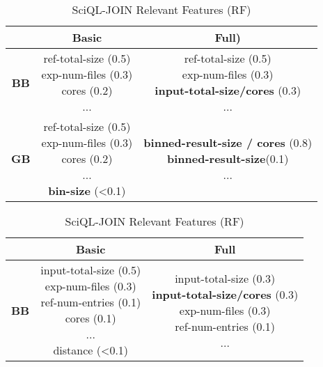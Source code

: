 \begin{table}[t]

\centering
\caption{SciQL-MAP Relevant Features (RF)}
\label{tab:relevant-features-map}

\begin{tabular}{|c||c||c|}
\hline
        & \textbf{Basic} &  \textbf{Full)} 


    \\ \hline
    
    \textbf{BB} 
    & \makecell{ref-total-size (0.5) \\ exp-num-files (0.3) \\ cores (0.2) \\ ...} 
    & \makecell{ ref-total-size (0.5) \\ exp-num-files (0.3) \\ \textbf{input-total-size/cores} (0.3) \\ ...} 
   
    
   \\ \hline %
    
    \textbf{GB} 
    & \makecell{ref-total-size (0.5) \\ exp-num-files (0.3) \\ cores (0.2) \\ ... \\ \textbf{bin-size} (<0.1)} 
    & \makecell{ \textbf{binned-result-size / cores} (0.8) \\ \textbf{binned-result-size}(0.1) \\ ...} 
    
    \\ \hline

\end{tabular}

\vspace{0.2cm}

\centering
\caption{SciQL-JOIN Relevant Features (RF)}
\label{tab:relevant-features-join}

\begin{tabular}{|c||c||c|}
\hline
        & \textbf{Basic} &  \textbf{Full} 


    \\ \hline
    
    \textbf{BB} 
    & \makecell{input-total-size (0.5) \\ exp-num-files (0.3) \\  ref-num-entries (0.1) \\ cores (0.1) \\ ... \\ distance (<0.1) } 
    & \makecell{ input-total-size (0.3) \\ \textbf{input-total-size/cores} (0.3) \\  exp-num-files (0.3) \\ ref-num-entries (0.1) \\ ...} 
   

\end{tabular}
\end{table}
